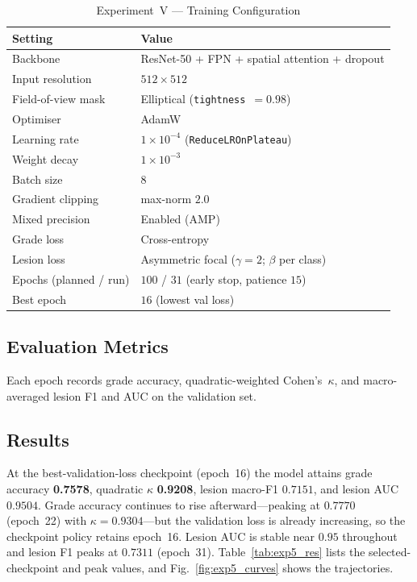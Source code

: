 \documentclass[journal,twoside,web]{ieeecolor}
\begin{document}
\begin{table}[!t]
\caption{Experiment~V --- Training Configuration}
\label{tab:exp5_hyper}
\centering
\setlength{\tabcolsep}{5pt}
\begin{tabular}{|l|l|}
\hline
\textbf{Setting} & \textbf{Value} \\
\hline
Backbone & ResNet-50 + FPN + spatial attention + dropout \\
Input resolution & $512\times512$ \\
Field-of-view mask & Elliptical (\texttt{tightness}~$=0.98$) \\
Optimiser & AdamW \\
Learning rate & $1\times10^{-4}$ (\texttt{ReduceLROnPlateau}) \\
Weight decay & $1\times10^{-3}$ \\
Batch size & $8$ \\
Gradient clipping & max-norm $2.0$ \\
Mixed precision & Enabled (AMP) \\
Grade loss & Cross-entropy \\
Lesion loss & Asymmetric focal ($\gamma{=}2$; $\beta$ per class) \\
Epochs (planned / run) & $100$ / $31$ (early stop, patience $15$) \\
Best epoch & $16$ (lowest val loss) \\
\hline
\end{tabular}
\end{table}

\subsection{Evaluation Metrics}
Each epoch records grade accuracy, quadratic-weighted Cohen's~$\kappa$, and
macro-averaged lesion F1 and AUC on the validation set.

\subsection{Results}
At the best-validation-loss checkpoint (epoch~16) the model attains grade accuracy
\textbf{0.7578}, quadratic $\kappa$ \textbf{0.9208}, lesion macro-F1 $0.7151$, and
lesion AUC $0.9504$. Grade accuracy continues to rise afterward---peaking at
$0.7770$ (epoch~22) with $\kappa=0.9304$---but the validation loss is already
increasing, so the checkpoint policy retains epoch~16. Lesion AUC is stable near
$0.95$ throughout and lesion F1 peaks at $0.7311$ (epoch~31).
Table~\ref{tab:exp5_res} lists the selected-checkpoint and peak values, and
Fig.~\ref{fig:exp5_curves} shows the trajectories.
\end{document}
